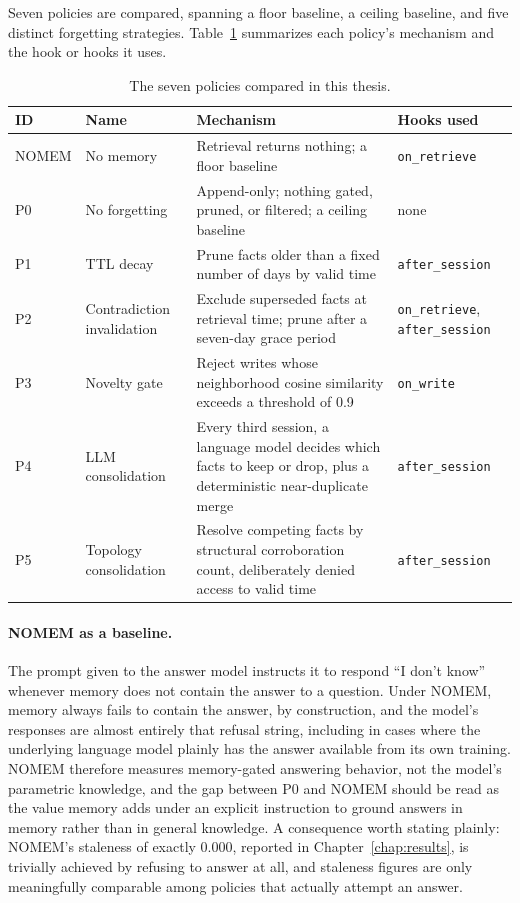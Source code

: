 Seven policies are compared, spanning a floor baseline, a ceiling baseline, and five distinct forgetting strategies. Table~\ref{tab:policies} summarizes each policy's mechanism and the hook or hooks it uses.

\begin{table}[H]
\centering
\caption{The seven policies compared in this thesis.}
\label{tab:policies}
\small
\begin{tabular}{lp{2.6cm}p{5.4cm}p{2.6cm}}
\toprule
ID & Name & Mechanism & Hooks used \\
\midrule
NOMEM & No memory & Retrieval returns nothing; a floor baseline & \texttt{on\_retrieve} \\
P0 & No forgetting & Append-only; nothing gated, pruned, or filtered; a ceiling baseline & none \\
P1 & TTL decay & Prune facts older than a fixed number of days by valid time & \texttt{after\_session} \\
P2 & Contradiction invalidation & Exclude superseded facts at retrieval time; prune after a seven-day grace period & \texttt{on\_retrieve}, \texttt{after\_session} \\
P3 & Novelty gate & Reject writes whose neighborhood cosine similarity exceeds a threshold of 0.9 & \texttt{on\_write} \\
P4 & LLM consolidation & Every third session, a language model decides which facts to keep or drop, plus a deterministic near-duplicate merge & \texttt{after\_session} \\
P5 & Topology consolidation & Resolve competing facts by structural corroboration count, deliberately denied access to valid time & \texttt{after\_session} \\
\bottomrule
\end{tabular}
\end{table}

\paragraph{NOMEM as a baseline.} The prompt given to the answer model instructs it to respond ``I don't know'' whenever memory does not contain the answer to a question. Under NOMEM, memory always fails to contain the answer, by construction, and the model's responses are almost entirely that refusal string, including in cases where the underlying language model plainly has the answer available from its own training. NOMEM therefore measures memory-gated answering behavior, not the model's parametric knowledge, and the gap between P0 and NOMEM should be read as the value memory adds under an explicit instruction to ground answers in memory rather than in general knowledge. A consequence worth stating plainly: NOMEM's staleness of exactly 0.000, reported in Chapter~\ref{chap:results}, is trivially achieved by refusing to answer at all, and staleness figures are only meaningfully comparable among policies that actually attempt an answer.

